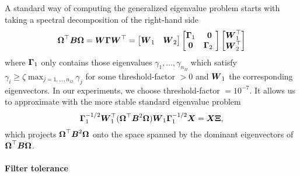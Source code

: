 A standard way of computing the generalized eigenvalue problem 
starts with taking a spectral decomposition of the right-hand side
\begin{equation}
    \boldsymbol{\Omega}^{\top} \boldsymbol{B} \boldsymbol{\Omega}
    = \boldsymbol{W} \boldsymbol{\Gamma} \boldsymbol{W}^{\top}
    = \begin{bmatrix} \boldsymbol{W}_1 & \boldsymbol{W}_2 \end{bmatrix} 
    \begin{bmatrix} \boldsymbol{\Gamma}_1 & \boldsymbol{0} \\ \boldsymbol{0} & \boldsymbol{\Gamma}_2 \ \end{bmatrix} 
    \begin{bmatrix} \boldsymbol{W}_1^{\top} \\ \boldsymbol{W}_2^{\top} \end{bmatrix}
\end{equation}
where $\boldsymbol{\Gamma}_1$ only contains those eigenvalues $\gamma_1, \dots, \gamma_{n_{\Omega}}$
which satisfy $\gamma_i \geq \zeta \max_{j=1,\dots,n_{\Omega}} \gamma_j$ 
for some \gls{threshold-factor} $>0$ and $\boldsymbol{W}_1$ the corresponding
eigenvectors. In our experiments, we choose \gls{threshold-factor} $=10^{-7}$.
It allows us to approximate 
with the more stable standard eigenvalue problem
\begin{equation}
    \boldsymbol{\Gamma}_1^{-1/2} \boldsymbol{W}_1^{\top} (\boldsymbol{\Omega}^{\top} \boldsymbol{B}^2 \boldsymbol{\Omega}) \boldsymbol{W}_1 \boldsymbol{\Gamma}_1^{-1/2} \boldsymbol{X} = \boldsymbol{X} \boldsymbol{\Xi},
    \label{equ:3-nystrom-converted-generalized-eigenvalue-problem}
\end{equation}
which projects $\boldsymbol{\Omega}^{\top} \boldsymbol{B}^2 \boldsymbol{\Omega}$ onto the space spanned
by the dominant eigenvectors of
$\boldsymbol{\Omega}^{\top} \boldsymbol{B} \boldsymbol{\Omega}$.\\

\paragraph{Filter tolerance}

